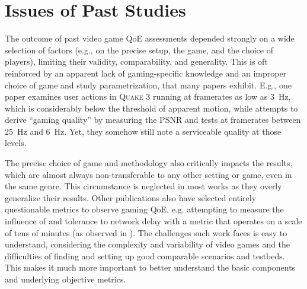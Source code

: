 \section{Issues of Past Studies}
\label{sec:relatedwork}

The outcome of past video game \gls{QoE} assessments depended strongly on a wide selection of factors (e.g., on the precise setup, the game, and the choice of players), limiting their validity, comparability, and generality. This is oft reinforced by an apparent lack of gaming-specific knowledge and an improper choice of game and study parametrization, that many papers exhibit. E.g., one paper \cite{claypool2007} examines user actions in \textsc{Quake 3} running at framerates as low as \SI{3}{\hertz}, which is considerably below the threshold of apparent motion, while \cite{5506572} attempts to derive ``gaming quality'' by measuring the \acrshort{PSNR} and tests at framerates between \SI{25}{\hertz} and \SI{6}{\hertz}. Yet, they somehow still note a serviceable quality at those levels.

The precise choice of game and methodology also critically impacts the results, which are almost always non-transferable to any other setting or game, even in the same genre. This circumstance is neglected in most works as they overly generalize their results. 
Other publications also have selected entirely questionable metrics to observe gaming \gls{QoE}, e.g. attempting to measure the influence of and tolerance to network delay with a metric that operates on a scale of tens of minutes (as observed in \cite{Claypool:2006:LPA:1167838.1167860}). The challenges such work faces is easy to understand, considering the complexity and variability of video games and the difficulties of finding and setting up good comparable scenarios and testbeds. This makes it much more important to better understand the basic components and underlying objective metrics.




